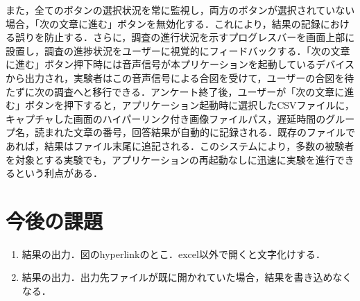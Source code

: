 また，全てのボタンの選択状況を常に監視し，両方のボタンが選択されていない場合，「次の文章に進む」ボタンを無効化する．これにより，結果の記録における誤りを防止する．さらに，調査の進行状況を示すプログレスバーを画面上部に設置し，調査の進捗状況をユーザーに視覚的にフィードバックする．「次の文章に進む」ボタン押下時には音声信号が本プリケーションを起動しているデバイスから出力され，実験者はこの音声信号による合図を受けて，ユーザーの合図を待たずに次の調査へと移行できる．アンケート終了後，ユーザーが「次の文章に進む」ボタンを押下すると，アプリケーション起動時に選択したCSVファイルに，キャプチャした画面のハイパーリンク付き画像ファイルパス，遅延時間のグループ名，読まれた文章の番号，回答結果が自動的に記録される．既存のファイルであれば，結果はファイル末尾に追記される．このシステムにより，多数の被験者を対象とする実験でも，アプリケーションの再起動なしに迅速に実験を進行できるという利点がある．
\section{今後の課題}
\begin{enumerate}
  \item 結果の出力．図のhyperlinkのとこ．excel以外で開くと文字化けする．
  \item 結果の出力．出力先ファイルが既に開かれていた場合，結果を書き込めなくなる．
\end{enumerate}
